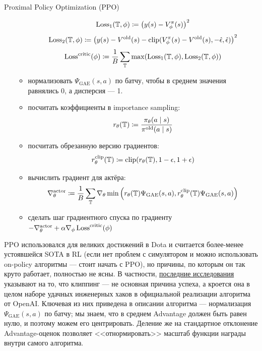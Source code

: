 \begin{algorithm}[label = PPOalgorithm]{Proximal Policy Optimization (PPO)}
\begin{enumerate}
\begin{itemize}
    $$\operatorname{Loss}_1(\mathbb{T}, \phi) \coloneqq \left( y(s) - V^\pi_\phi(s) \right) ^2$$
    $$\operatorname{Loss}_2(\mathbb{T}, \phi) \coloneqq \left( y(s) - V^{\mathrm{old}}(s) - \mathrm{clip}(V^\pi_\phi(s) - V^{\mathrm{old}}(s), -\hat{\epsilon}, \hat{\epsilon}) \right) ^2$$
    $$\operatorname{Loss}^{\mathrm{critic}}(\phi) \coloneqq \frac{1}{B}\sum_{\mathbb{T}} \max(\operatorname{Loss}_1(\mathbb{T}, \phi), \operatorname{Loss}_2(\mathbb{T}, \phi))$$
    \item нормализовать $\Psi_{\mathrm{GAE}}(s, a)$ по батчу, чтобы в среднем значения равнялись 0, а дисперсия --- 1.
    \item посчитать коэффициенты в importance sampling:
    $$r_\theta(\mathbb{T}) \coloneqq \frac{\pi_\theta(a \mid s)}{\pi^{\mathrm{old}}(a \mid s)}$$
    \item посчитать обрезанную версию градиентов:
    $$r_\theta^{\mathrm{clip}}(\mathbb{T}) \coloneqq \mathrm{clip}(r_\theta(\mathbb{T}), 1 - \epsilon, 1 + \epsilon)$$
    \item вычислить градиент для актёра:
    $$\nabla^{\mathrm{actor}}_\theta \coloneqq \frac{1}{B}\sum_{\mathbb{T}} \nabla_\theta \min \left( r_\theta(\mathbb{T})\Psi_{\mathrm{GAE}}(s, a), r_\theta^{\mathrm{clip}}(\mathbb{T})\Psi_{\mathrm{GAE}}(s, a) \right) $$
    \item сделать шаг градиентного спуска по градиенту $-\nabla^{\mathrm{actor}}_\theta + \alpha \nabla_\phi \operatorname{Loss}^{\mathrm{critic}}(\phi)$
    \end{itemize}
\end{enumerate}
\end{algorithm}

\begin{remark}
PPO использовался для великих достижений в Dota и считается более-менее устоявшейся SOTA в RL (если нет проблем с симулятором и можно использовать on-policy алгоритмы --- стоит начать с PPO), но причины, по которым он так круто работает, полностью не ясны. В частности, \href{https://openreview.net/forum?id=r1etN1rtPB}{последние исследования} указывают на то, что клиппинг --- не основная причина успеха, а кроется она в целом наборе удачных инженерных хаков в официальной реализации алгоритма от OpenAI. Ключевая из них приведена в описании алгоритма --- нормализация $\Psi_{\mathrm{GAE}}(s, a)$ по батчу; мы знаем, что в среднем Advantage должен быть равен нулю, и поэтому можем его центрировать. Деление же на стандартное отклонение Advantage-оценок позволяет <<отнормировать>> масштаб функции награды внутри самого алгоритма.
\end{remark}

